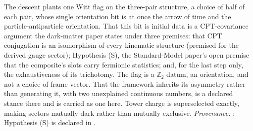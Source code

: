 The descent plants one Witt flag on the three-pair structure, a choice of half of each pair, whose single orientation bit is at once the arrow of time and the particle-antiparticle orientation. That this bit is initial data is a CPT-covariance argument the dark-matter paper states under three premises: that CPT conjugation is an isomorphism of every kinematic structure (premised for the derived gauge sector); Hypothesis (S), the Standard-Model paper's open premise that the composite's slots carry fermionic statistics; and, for the last step only, the exhaustiveness of its trichotomy. The flag is a $\mathbb{Z}_{2}$ datum, an orientation, and not a choice of frame vector. That the framework inherits its asymmetry rather than generating it, with two unexplained continuous numbers, is a declared stance there and is carried as one here. Tower charge is superselected exactly, making sectors mutually dark rather than mutually exclusive. \emph{Provenance:} \cite[Def.~2.10, Prop.~4.1, Prop.~5.1 (stance), Prop.~5.2 (under its three premises)]{ButlerT14}; Hypothesis (S) is declared in \cite[\S5]{ButlerT12}.
